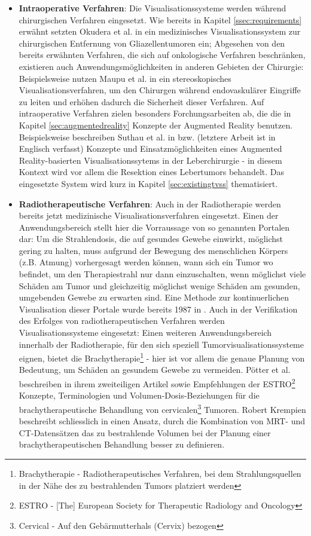 \documentclass[a4paper,titlepage,12pt]{scrartcl}
\newtheorem[L]{boxedDefinition}{Definition}
\begin{document}
\begin{itemize}
 \item \textbf{Intraoperative Verfahren}: Die Visualisationssysteme werden während chirurgischen Verfahren eingesetzt. Wie bereits in Kapitel \ref{ssec:requirements} erwähnt setzten Okudera et al. in \cite{Okudera1994} ein medizinisches Visualisationssystem zur chirurgischen Entfernung von Gliazellentumoren ein;  Abgesehen von den bereits erwähnten Verfahren, die sich auf onkologische Verfahren beschränken, existieren auch Anwendungsmöglichkeiten in anderen Gebieten der Chirurgie: Beispielsweise nutzen Maupu et al. in \cite{Maupu2005} ein stereoskopisches Visualisationsverfahren, um den Chirurgen während endovaskulärer Eingriffe zu leiten und erhöhen dadurch die Sicherheit dieser Verfahren. Auf intraoperative Verfahren zielen besonders Forchungsarbeiten ab, die die in Kapitel \vref{sec:augmentedreality} Konzepte der Augmented Reality benutzen. Beispielsweise beschreiben Suthau et al. in \cite{Suthau2002DE} bzw. \cite{Suthau2002} (letztere Arbeit ist in Englisch verfasst) Konzepte und Einsatzmöglichkeiten eines Augmented Reality-basierten Visualisationssytems in der Leberchirurgie - in diesem Kontext wird vor allem die Resektion eines Lebertumors behandelt. Das eingesetzte System wird kurz in Kapitel \vref{sec:existingtvss} thematisiert.
 \item \textbf{Radiotherapeutische Verfahren}: Auch in der Radiotherapie werden bereits jetzt medizinische Visualisationsverfahren eingesetzt. Einen der Anwendungsbereich stellt hier die Vorraussage von so genannten Portalen dar: Um die Strahlendosis, die auf gesundes Gewebe einwirkt, möglichst gering zu halten, muss aufgrund der Bewegung des menschlichen Körpers (z.B. Atmung) vorhergesagt werden können, wann sich ein Tumor wo befindet, um den Therapiestrahl nur dann einzuschalten, wenn möglichst viele Schäden am Tumor und gleichzeitig möglichst wenige Schäden am gesunden, umgebenden Gewebe zu erwarten sind. Eine Methode zur kontinuerlichen Visualisation dieser Portale wurde bereits 1987 in \cite{Leong1987}. Auch in der Verifikation des Erfolges von radiotherapeutischen Verfahren werden Visualisationssysteme eingesetzt:
 Einen weiteren Anwendungsbereich innerhalb der Radiotherapie, für den sich speziell Tumorvisualisationssysteme eignen, bietet die Brachytherapie\footnote{Brachytherapie - Radiotherapeutisches Verfahren, bei dem Strahlungsquellen in der Nähe des zu bestrahlenden Tumors platziert werden} - hier ist vor allem die genaue Planung von Bedeutung, um Schäden an gesundem Gewebe zu vermeiden.
 Pötter et al. beschreiben in ihrem zweiteiligen Artikel \cite{Poetter2005} sowie \cite{Poetter2006} Empfehlungen der ESTRO\footnote{ESTRO - [The] European Society for Therapeutic Radiology and Oncology} Konzepte, Terminologien und Volumen-Dosis-Beziehungen für die brachytherapeutische Behandlung von cervicalen\footnote{Cervical - Auf den Gebärmutterhals (Cervix) bezogen} Tumoren. Robert Krempien beschreibt schliesslich in \cite{Krempien2003} einen Ansatz, durch die Kombination von MRT- und CT-Datensätzen das zu bestrahlende Volumen bei der Planung einer brachytherapeutischen Behandlung besser zu definieren.
\end{itemize}
\end{document}
